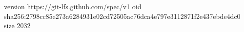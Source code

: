 version https://git-lfs.github.com/spec/v1
oid sha256:2798cc85e273a6284931e02cd72505ac76dca4e797e3112871f2e437ebde4dc0
size 2032

